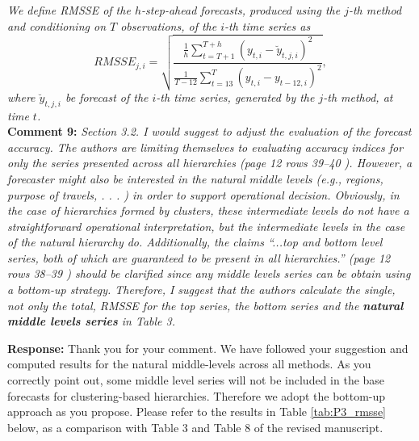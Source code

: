 \documentclass{article}
\numberwithin{equation}{section}
\theoremstyle{plain}
\theoremstyle{definition}
\theoremstyle{remark}
\begin{document}
\textit{We define RMSSE of the $h$-step-ahead forecasts, produced using the $j$-th method and conditioning on $T$ observations, of the $i$-th time series as
\[
RMSSE_{j, i} = \sqrt{\frac{\frac{1}{h}\displaystyle\sum_{t=T+1}^{T+h}(y_{t, i}-\breve y_{t, j, i})^2}{\frac{1}{T-12}\displaystyle\sum_{t=13}^T (y_{t, i} - y_{t-12, i})^2}},
\]
where $\breve y_{t,j,i}$ be forecast of the $i$-th time series, generated by the $j$-th method, at time $t$.}\\

\textbf{Comment 9:} \textit{Section 3.2. I would suggest to adjust the evaluation of the forecast accuracy. The authors are limiting themselves to evaluating accuracy indices for only the series presented across all hierarchies (page 12 rows 39--40 ). However, a forecaster might also be interested in the natural middle levels (e.g., regions,
purpose of travels, . . . ) in order to support operational decision. Obviously, in the case of hierarchies formed by clusters, these intermediate levels do not have a straightforward operational interpretation, but the intermediate levels in the case of the natural hierarchy do. Additionally, the claims ``...top and bottom level series, both of which are guaranteed to be present in all hierarchies.'' (page 12 rows 38--39 ) should be clarified since any middle levels series can be obtain using a bottom-up strategy. Therefore, I suggest that the authors calculate the single, not only the total, RMSSE for the top series, the bottom series and the \textbf{natural middle levels series} in Table 3.}

\medskip

\noindent \textbf{Response:} %
Thank you for your comment. We have followed your suggestion and computed results for the natural middle-levels across all methods. As you correctly point out, some middle level series will not be included in the base forecasts for clustering-based hierarchies. Therefore we adopt the bottom-up approach as you propose. Please refer to the results in Table \ref{tab:P3_rmsse} below, as a comparison with Table 3 and Table 8 of the revised manuscript. \\
\end{document}

